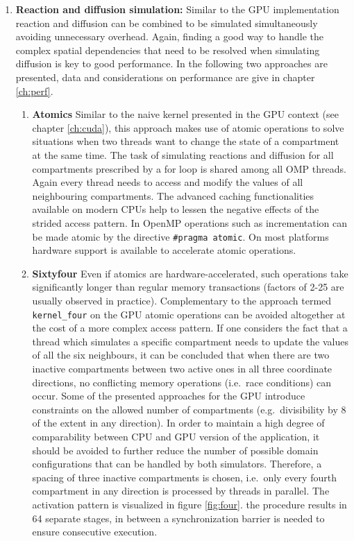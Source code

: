 \begin{enumerate}
\item \textbf{Reaction and diffusion simulation:} 
Similar to the GPU implementation reaction and diffusion can be combined to be simulated simultaneously avoiding unnecessary overhead. Again, finding a good way to handle the complex spatial dependencies that need to be resolved when simulating diffusion is key to good performance. In the following two approaches are presented, data and considerations on performance are give in chapter \ref{ch:perf}. 
\begin{enumerate}
\item \textbf{Atomics} Similar to the naive kernel presented in the GPU context (see chapter \ref{ch:cuda}), this approach makes use of atomic operations to solve situations when two threads want to change the state of a compartment at the same time. The task of simulating reactions and diffusion for all compartments prescribed by a for loop is shared among all OMP threads. Again every thread needs to access and modify the values of all neighbouring compartments. The advanced caching functionalities available on modern CPUs help to lessen the negative effects of the strided access pattern. In OpenMP operations such as incrementation can be made atomic by the directive \texttt{\#pragma atomic}. On most platforms hardware support is available to accelerate atomic operations. 
\item \textbf{Sixtyfour} Even if atomics are hardware-accelerated, such operations take significantly longer than regular memory transactions (factors of 2-25 are usually observed in practice). Complementary to the approach termed \texttt{kernel\_four} on the GPU atomic operations can be avoided altogether at the cost of a more complex access pattern. If one considers the fact that a thread which simulates a specific compartment needs to update the values of all the six neighbours, it can be concluded that when there are two inactive compartments between two active ones in all three coordinate directions, no conflicting memory operations (i.e.\ race conditions) can occur. Some of the presented approaches for the GPU introduce constraints on the allowed number of compartments (e.g.\ divisibility by 8 of the extent in any direction). In order to maintain a high degree of comparability between CPU and GPU version of the application, it should be avoided to further reduce the number of possible domain configurations that can be handled by both simulators. Therefore, a spacing of three inactive compartments is chosen, i.e.\ only every fourth compartment in any direction is processed by threads in parallel. The activation pattern is visualized in figure \ref{fig:four}. the procedure results in 64 separate stages, in between a synchronization barrier is needed to ensure consecutive execution. 

\end{enumerate}
\end{enumerate}
